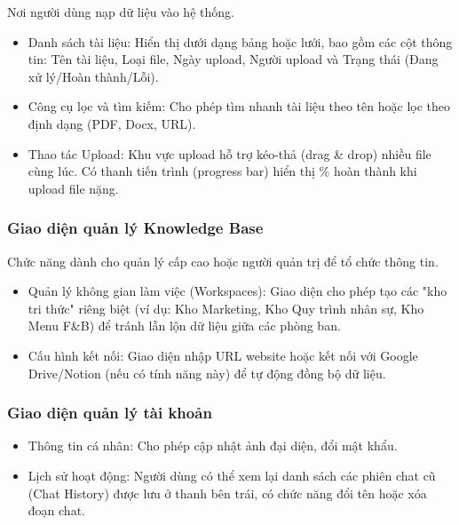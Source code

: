 Nơi người dùng nạp dữ liệu vào hệ thống.

\begin{itemize}
\item
  Danh sách tài liệu: Hiển thị dưới dạng bảng hoặc lưới, bao gồm các cột
  thông tin: Tên tài liệu, Loại file, Ngày upload, Người upload và Trạng
  thái (Đang xử lý/Hoàn thành/Lỗi).
\item
  Công cụ lọc và tìm kiếm: Cho phép tìm nhanh tài liệu theo tên hoặc lọc
  theo định dạng (PDF, Docx, URL).
\item
  Thao tác Upload: Khu vực upload hỗ trợ kéo-thả (drag \& drop) nhiều
  file cùng lúc. Có thanh tiến trình (progress bar) hiển thị \% hoàn
  thành khi upload file nặng.
\end{itemize}

\subsubsection{Giao diện quản lý Knowledge
Base}\label{giao-diux1ec7n-quux1ea3n-luxfd-knowledge-base}

Chức năng dành cho quản lý cấp cao hoặc người quản trị để tổ chức thông
tin.

\begin{itemize}
\item
  Quản lý không gian làm việc (Workspaces): Giao diện cho phép tạo các
  "kho tri thức" riêng biệt (ví dụ: Kho Marketing, Kho Quy trình nhân
  sự, Kho Menu F\&B) để tránh lẫn lộn dữ liệu giữa các phòng ban.
\item
  Cấu hình kết nối: Giao diện nhập URL website hoặc kết nối với Google
  Drive/Notion (nếu có tính năng này) để tự động đồng bộ dữ liệu.
\end{itemize}

\subsubsection{Giao diện quản lý tài
khoản}\label{giao-diux1ec7n-quux1ea3n-luxfd-tuxe0i-khoux1ea3n}

\begin{itemize}
\item
  Thông tin cá nhân: Cho phép cập nhật ảnh đại diện, đổi mật khẩu.
\item
  Lịch sử hoạt động: Người dùng có thể xem lại danh sách các phiên chat
  cũ (Chat History) được lưu ở thanh bên trái, có chức năng đổi tên hoặc
  xóa đoạn chat.
\end{itemize}

